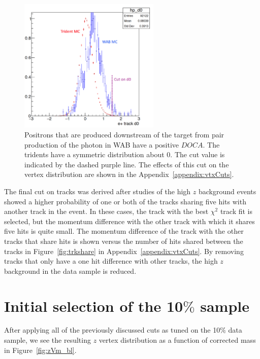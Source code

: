 \begin{figure}[htb]
  \centering
      \includegraphics[width=0.6\textwidth]{pics/searching/epd0cut.png}
  \caption[Cut on the $e^+$ $DOCA$ to remove WAB]{Positrons that are produced downstream of the target from pair production of the photon in WAB have a positive $DOCA$. The tridents have a symmetric distribution about 0. The cut value is indicated by the dashed purple line. The effects of this cut on the vertex distribution are shown in the Appendix~\ref{appendix:vtxCuts}.}
  \label{fig:docacut}
\end{figure} 

The final cut on tracks was derived after studies of the high $z$ background events showed a higher probability of one or both of the tracks sharing five hits with another track in the event. In these cases, the track with the best $\chi^2$ track fit is selected, but the momentum difference with the other track with which it shares five hits is quite small. The momentum difference of the track with the other tracks that share hits is shown versus the number of hits shared between the tracks in Figure~\ref{fig:trkshare}  in Appendix~\ref{appendix:vtxCuts}. By removing tracks that only have a one hit difference with other tracks, the high $z$ background in the data sample is reduced.   

\section{Initial selection of the 10$\%$ sample}
After applying all of the previously discussed cuts as tuned on the 10$\%$ data sample, we see the resulting $z$ vertex distribution as a function of corrected mass in Figure~\ref{fig:zVm_bl}.

